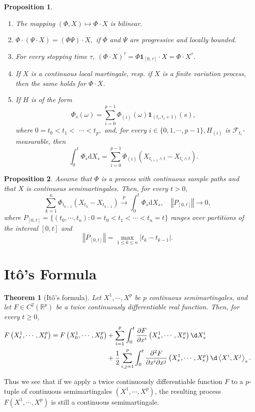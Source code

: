 \documentclass{report}
\newtheorem{proposition}{Proposition}[section]
\newtheorem{theorem}{Theorem}[section]
\theoremstyle{nonumberplain}
\begin{document}
\begin{proposition}
	\begin{enumerate}
		\item The mapping $(\Phi, X) \mapsto \Phi \cdot X$ is bilinear.
		\item $\Phi \cdot(\Psi \cdot X)=(\Phi \Psi) \cdot X,$ if $\Phi$ and $\Psi$ are progressive and locally bounded.
		\item For every stopping time $\tau$, $(\Phi \cdot X)^{\tau}=\Phi \mathbf{1}_{[0, \tau]} \cdot X=\Phi \cdot X^{\tau}$.
		\item If $X$ is a continuous local martingale, resp. if $X$ is a finite variation process, then the same holds for $\Phi \cdot X$.
		\item If $H$ is of the form 
		$$
		\Phi_{s}(\omega)=\sum_{i=0}^{p-1} \Phi_{(i)}(\omega) \mathbf{1}_{\left(t_{i}, t_{i}+1\right)}(s),
		$$
		where $0=t_{0}<t_{1}<$
		$\cdots<t_{p},$ and, for every $i \in\{0,1, \cdots, p-1\}, H_{(i)}$ is $\mathcal{F}_{t_{i}}$-measurable, then
		\[
		\int_{0}^{t} \Phi_{s} \mathrm{d} X_{s}=\sum_{i=0}^{p-1} \Phi_{(i)}\left(X_{t_{i+1} \wedge t}-X_{t_{i} \wedge t}\right).
		\]
	\end{enumerate}
\end{proposition}


\begin{proposition}
	Assume that $\Phi$ is a process with continuous sample paths and that $X$ is continuous semimartingales. Then, for every $t>0$,
	\[
	\sum_{k=1}^{n} \Phi_{t_{k-1}}\left(X_{t_{k}}-X_{t_{k-1}}\right)\stackrel{p}{\longrightarrow}\int_{0}^{t} \Phi_{s} \mathrm{d} X_{s},\quad\left\Vert P_{[0,t]}\right\Vert \longrightarrow 0,
	\]
	where $P_{[0,t]}=\{(t_0,\cdots,t_n):0=t_0<t_1<\cdots<t_n=t\}$ ranges over partitions of the interval $[0,t]$ and 
	\[
	\left\Vert P_{[0,t]}\right\Vert=\max\limits_{1\le k\le n}{|t_k-t_{k-1}|}.
	\]
\end{proposition}

\section{Itô's Formula}
\begin{theorem}[Itô's formula]
	Let $X^{1}, \cdots, X^{p}$ be $p$ continuous semimartingales, and let $F\in C^2(\mathbb{R}^{p})$ be a twice continuously differentiable real function. Then, for every $t \geq 0$,
	\begin{align}
		F\left(X_{t}^{1}, \cdots, X_{t}^{p}\right)=F\left(X_{0}^{1}, \cdots, X_{0}^{p}\right) &+\sum_{i=1}^{p} \int_{0}^{t} \frac{\partial F}{\partial x^{i}}\left(X_{s}^{1}, \cdots, X_{s}^{p}\right) \d X_{s}^{i} \nonumber\\
		&+\frac{1}{2} \sum_{i, j=1}^{p} \int_{0}^{t} \frac{\partial^{2} F}{\partial x^{i} \partial x^{j}}\left(X_{s}^{1}, \cdots, X_{s}^{p}\right) \d\left\langle X^{i}, X^{j}\right\rangle_{s}.\label{ito}
	\end{align}
\end{theorem}
Thus we see that if we apply a twice continuously differentiable function $F$ to a $p$-tuple of continuous semimartingales $(X^{1}, \cdots, X^{p})$, the resulting process $F(X^{1}, \cdots, X^{p})$ is still a continuous semimartingale.
\end{document}
